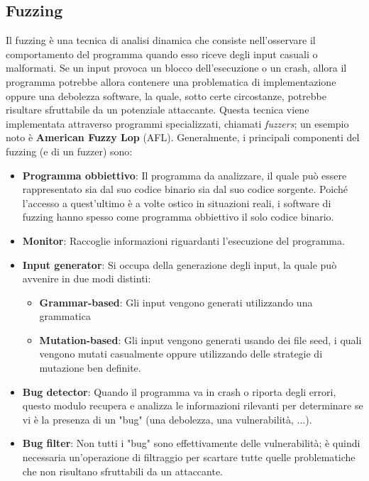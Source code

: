 \documentclass[../main.tex]{subfiles}
\begin{document}
\subsection{Fuzzing}
Il fuzzing è una tecnica di analisi dinamica che consiste nell'osservare il comportamento del programma quando esso
riceve degli input casuali o malformati. Se un input provoca un blocco dell'esecuzione o un crash, allora il programma
potrebbe allora contenere una problematica di implementazione oppure una debolezza software, la quale, sotto certe circostanze, potrebbe
risultare sfruttabile da un potenziale attaccante.
Questa tecnica viene implementata attraverso programmi specializzati, chiamati \textit{fuzzers}; un esempio noto è \textbf{American Fuzzy Lop} (AFL).
Generalmente, i principali componenti del fuzzing (e di un fuzzer) sono\cite{Fuzzing_soa}:
\begin{itemize}
    \item \textbf{Programma obbiettivo}: Il programma da analizzare, il quale può essere rappresentato sia dal suo codice binario sia dal suo codice sorgente. Poiché l'accesso a quest'ultimo è a volte ostico in situazioni reali, i software di fuzzing hanno spesso
    come programma obbiettivo il solo codice binario.
    \item \textbf{Monitor}: Raccoglie informazioni riguardanti l'esecuzione del programma.
    \item \textbf{Input generator}: Si occupa della generazione degli input, la quale può avvenire in due modi distinti:
    \begin{itemize}
        \item \textbf{Grammar-based}: Gli input vengono generati utilizzando una grammatica 
        \item \textbf{Mutation-based}: Gli input vengono generati usando dei file seed, i quali vengono mutati casualmente oppure utilizzando
        delle strategie di mutazione ben definite.
    \end{itemize}
    \item \textbf{Bug detector}: Quando il programma va in crash o riporta degli errori, questo modulo recupera e analizza le informazioni rilevanti per determinare se vi è la presenza di un "bug" (una debolezza, una vulnerabilità, ...).
    \item \textbf{Bug filter}: Non tutti i "bug" sono effettivamente delle vulnerabilità; è quindi necessaria un'operazione di filtraggio per scartare tutte quelle problematiche che non risultano sfruttabili da un attaccante.
\end{itemize}
\end{document}
